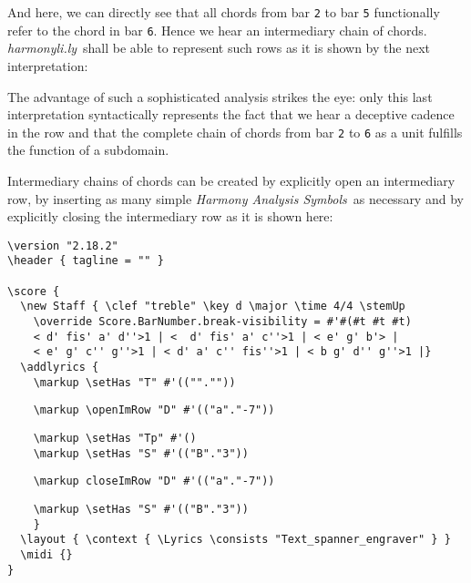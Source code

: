 \documentclass[
  DIV=calc,
  BCOR=5mm,
  12pt,
  headings=small,
  oneside,
  abstract=true,
  toc=bib,
  xcolor=dvipsnames,
  openany,
  ngerman,english]{scrartcl}
\newcommand{\hlyn}[0]{\textit{harmonyli.ly}}
\newcommand{\has}[1]{\textit{Harmony Analysis Symbol#1}}
\begin{document}
And here, we can directly see that all chords from bar \texttt{2} to bar
\texttt{5} functionally refer to the chord in bar \texttt{6}. Hence we hear an
intermediary chain of chords. \hlyn\ shall be able to represent such rows as it
is shown by the next interpretation:

\begin{center}
\end{center}

The advantage of such a sophisticated analysis strikes the eye: only this last
interpretation syntactically represents the fact that we hear a deceptive
cadence in the row and that the complete chain of chords from bar \texttt{2} to
\texttt{6} as a unit fulfills the function of a subdomain.

Intermediary chains of chords can be created by explicitly open an intermediary
row, by inserting as many simple \has{s}\ as necessary and by explicitly closing
the intermediary row as it is shown here:
\begin{scriptsize}
\begin{verbatim}
\version "2.18.2"
\header { tagline = "" }

\score {
  \new Staff { \clef "treble" \key d \major \time 4/4 \stemUp 
    \override Score.BarNumber.break-visibility = #'#(#t #t #t)
    < d' fis' a' d''>1 | <  d' fis' a' c''>1 | < e' g' b'> |
    < e' g' c'' g''>1 | < d' a' c'' fis''>1 | < b g' d'' g''>1 |}
  \addlyrics { 
    \markup \setHas "T" #'((""."")) 
\end{verbatim}
{ \color{red} \verb|    \markup \openImRow "D" #'(("a"."-7"))| }
\begin{verbatim} 
    \markup \setHas "Tp" #'() 
    \markup \setHas "S" #'(("B"."3"))     
\end{verbatim}
{ \color{red} \verb|    \markup closeImRow "D" #'(("a"."-7"))| }
\begin{verbatim}  
    \markup \setHas "S" #'(("B"."3"))
    }
  \layout { \context { \Lyrics \consists "Text_spanner_engraver" } }
  \midi {}
}

\end{verbatim}
\end{scriptsize}
\end{document}
